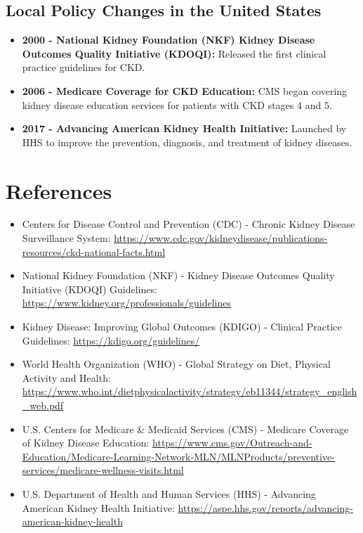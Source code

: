 \documentclass{article}
\begin{document}
\subsection{Local Policy Changes in the United States}
\begin{itemize}
    \item \textbf{2000 - National Kidney Foundation (NKF) Kidney Disease Outcomes Quality Initiative (KDOQI):} Released the first clinical practice guidelines for CKD.
    \item \textbf{2006 - Medicare Coverage for CKD Education:} CMS began covering kidney disease education services for patients with CKD stages 4 and 5.
    \item \textbf{2017 - Advancing American Kidney Health Initiative:} Launched by HHS to improve the prevention, diagnosis, and treatment of kidney diseases.
\end{itemize}

\section*{References}
\begin{itemize}
    \item Centers for Disease Control and Prevention (CDC) - Chronic Kidney Disease Surveillance System: \url{https://www.cdc.gov/kidneydisease/publications-resources/ckd-national-facts.html}
    \item National Kidney Foundation (NKF) - Kidney Disease Outcomes Quality Initiative (KDOQI) Guidelines: \url{https://www.kidney.org/professionals/guidelines}
    \item Kidney Disease: Improving Global Outcomes (KDIGO) - Clinical Practice Guidelines: \url{https://kdigo.org/guidelines/}
    \item World Health Organization (WHO) - Global Strategy on Diet, Physical Activity and Health: \url{https://www.who.int/dietphysicalactivity/strategy/eb11344/strategy_english_web.pdf}
    \item U.S. Centers for Medicare & Medicaid Services (CMS) - Medicare Coverage of Kidney Disease Education: \url{https://www.cms.gov/Outreach-and-Education/Medicare-Learning-Network-MLN/MLNProducts/preventive-services/medicare-wellness-visits.html}
    \item U.S. Department of Health and Human Services (HHS) - Advancing American Kidney Health Initiative: \url{https://aspe.hhs.gov/reports/advancing-american-kidney-health}
\end{itemize}
\end{document}
